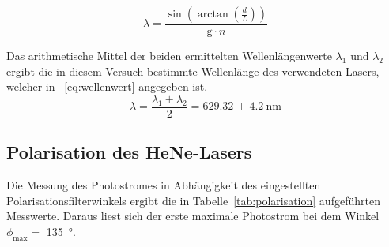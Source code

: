 \begin{equation}
\lambda = \frac{\sin{\left(\arctan{\left(\frac{d}{L}\right)}\right)}} 
{\text{g}\cdot n}
\label{eq:wellenlaenge}
\end{equation}
%

Das arithmetische Mittel der beiden ermittelten Wellenlängenwerte 	
$\lambda_1$ und $\lambda_2$ ergibt die in diesem Versuch 
bestimmte Wellenlänge des verwendeten Lasers, welcher in 
~\eqref{eq:wellenwert} angegeben ist.
\begin{equation}
\lambda = \frac{\lambda_1 + \lambda_2}{2} = \SI{629.32(420)}{\nano\metre}
\label{eq:wellenwert}
\end{equation}
%
\subsection{Polarisation des HeNe-Lasers}
%

Die Messung des Photostromes in Abhängigkeit des eingestellten 
Polarisationsfilterwinkels ergibt die in 
Tabelle~\ref{tab:polarisation} aufgeführten Messwerte. Daraus liest 
sich der erste maximale Photostrom bei dem Winkel 
$\phi_\text{max} =$ \SI{135}{\degree}. 
%

